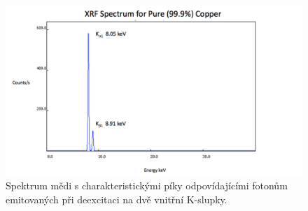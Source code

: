  \begin{figure}[htbp!]
\centering
\includegraphics[scale = 0.4]{Figure/spektrum.png}
 \caption{Spektrum mědi s charakteristickými píky odpovídajícími fotonům emitovaných při deexcitaci na dvě vnitřní K-slupky.}
\end{figure}

